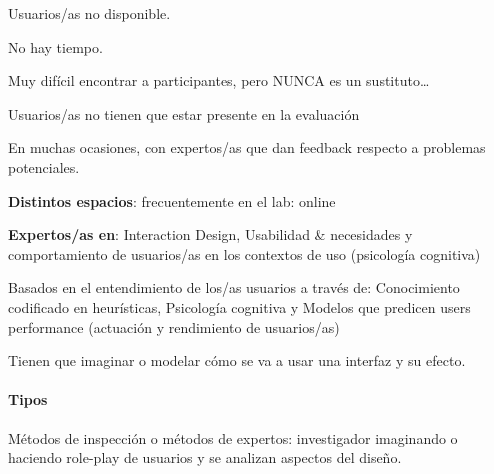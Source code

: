 \documentclass[12pt, twoside, openright]{report} %
\begin{document}
Usuarios/as no disponible.

No hay tiempo.

Muy difícil encontrar a participantes, pero NUNCA es un sustituto…

Usuarios/as no tienen que estar presente en la evaluación

En muchas ocasiones, con expertos/as que dan feedback respecto a problemas
potenciales.

\textbf{Distintos espacios}: frecuentemente en el lab: online

\textbf{Expertos/as en}: Interaction Design, Usabilidad \& necesidades y comportamiento de usuarios/as en los contextos de uso (psicología cognitiva)

Basados en el entendimiento de los/as usuarios a través de: Conocimiento codificado en heurísticas, Psicología cognitiva y Modelos que predicen users performance (actuación y rendimiento de usuarios/as)

Tienen que imaginar o modelar cómo se va a usar una interfaz y su efecto.

\paragraph{Tipos}
Métodos de inspección o métodos de expertos: investigador imaginando o haciendo role-play de usuarios y se analizan aspectos del diseño.
\end{document}
